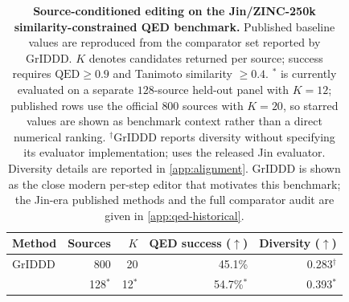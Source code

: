 \begin{table}[!ht]
\centering
{\small
\begin{tabular}{lrrrr}
\toprule
Method & Sources & $K$ & QED success ($\uparrow$) & Diversity ($\uparrow$) \\
\midrule
GrIDDD \citep{ninniri2025griddd} & 800 & 20 & 45.1\% & 0.283$^{\dagger}$ \\
\midrule
\textbf{\method{}} & 128$^{*}$ & 12$^{*}$ & 54.7\%$^{*}$ & 0.393$^{*}$ \\
\bottomrule
\end{tabular}}
\caption{\small\textbf{Source-conditioned editing on the Jin/ZINC-250k similarity-constrained QED benchmark.} Published baseline values are reproduced from the comparator set reported by GrIDDD. $K$ denotes candidates returned per source; success requires $\mathrm{QED}\ge0.9$ and Tanimoto similarity $\ge0.4$. $^{*}$\method{} is currently evaluated on a separate $128$-source held-out panel with $K=12$; published rows use the official $800$ sources with $K=20$, so starred values are shown as benchmark context rather than a direct numerical ranking. $^{\dagger}$GrIDDD reports diversity without specifying its evaluator implementation; \method{} uses the released Jin evaluator. Diversity details are reported in \cref{app:alignment}. GrIDDD is shown as the close modern per-step editor that motivates this benchmark; the Jin-era published methods and the full comparator audit are given in \cref{app:qed-historical}.}
\label{tab:qed}
\end{table}

